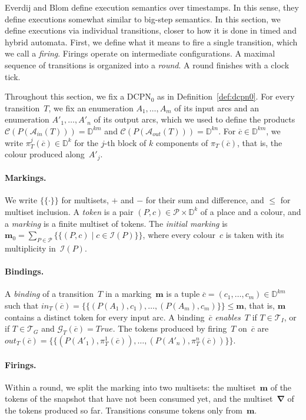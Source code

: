 \documentclass[11pt]{article}
\theoremstyle{definition}
\newcommand{\Dom}{\mathbb{D}}
\newcommand{\mset}[1]{\{\!\{#1\}\!\}}
\newcommand{\cvec}{\overline{c}}
\newcommand{\bfm}{\mathbf{m}}
\newcommand{\bfNabla}{\boldsymbol{\nabla}}
\newcommand{\DCPN}[1]{\texorpdfstring{\textup{DCPN}\ensuremath{_{#1}}}{DCPN#1}}
\begin{document}
Everdij and Blom define execution semantics over timestamps. In this sense,
they define executions somewhat similar to big-step semantics. In this section,
we define executions via individual transitions, closer to how it is done in
timed and hybrid automata. First, we define what it means to fire a single
transition, which we call a \emph{firing}. Firings operate on intermediate
configurations. A
maximal sequence of transitions is organized into a \emph{round}. A round
finishes with a clock tick.

Throughout this section, we fix a \DCPN{0} as in
Definition~\ref{def:dcpn0}. For every transition~$T$, we fix an enumeration
$A_1, \dots, A_m$ of its input arcs and an enumeration $A'_1, \dots, A'_n$ of
its output arcs, which we used to define the products
$\mathcal{C}(P(\mathcal{A}_{\mathit{in}}(T))) = \Dom^{km}$ and
$\mathcal{C}(P(\mathcal{A}_{\mathit{out}}(T))) = \Dom^{kn}$. For
$\cvec \in \Dom^{km}$, we write $\pi_T^j(\cvec) \in \Dom^k$ for the $j$-th block of
$k$ components of $\pi_T(\cvec)$, that is, the colour produced along~$A'_j$.

\paragraph{Markings.}
We write $\mset{\cdot}$ for multisets, $+$ and $-$ for their sum and
difference, and $\le$ for multiset inclusion. A \emph{token} is a pair
$(P, c) \in \mathcal{P} \times \Dom^k$ of a place and a colour, and a
\emph{marking} is a finite multiset of tokens. The \emph{initial marking} is
$\bfm_0 = \sum_{P \in \mathcal{P}} \mset{(P, c) \mid c \in \mathcal{I}(P)}$, where
every colour~$c$ is taken with its multiplicity in~$\mathcal{I}(P)$.

\paragraph{Bindings.}
A \emph{binding} of a transition~$T$ in a marking~$\bfm$ is a tuple
$\cvec = (c_1, \dots, c_m) \in \Dom^{km}$ such that
$\mathit{in}_T(\cvec) = \mset{(P(A_1), c_1), \dots, (P(A_m), c_m)} \le \bfm$, that is,
$\bfm$ contains a distinct token for every input arc. A binding~$\cvec$
\emph{enables}~$T$ if $T \in \mathcal{T}_I$, or if $T \in \mathcal{T}_G$ and
$\mathcal{G}_T(\cvec) = \mathit{True}$. The tokens produced by firing~$T$ on~$\cvec$
are $\mathit{out}_T(\cvec) = \mset{(P(A'_1), \pi_T^1(\cvec)), \dots,
(P(A'_n), \pi_T^n(\cvec))}$.

\paragraph{Firings.}
Within a round, we split the marking into two multisets: the multiset~$\bfm$
of the tokens of the snapshot that have not been consumed yet, and the
multiset~$\bfNabla$ of the tokens produced so far. Transitions consume tokens
only from~$\bfm$.
\end{document}
